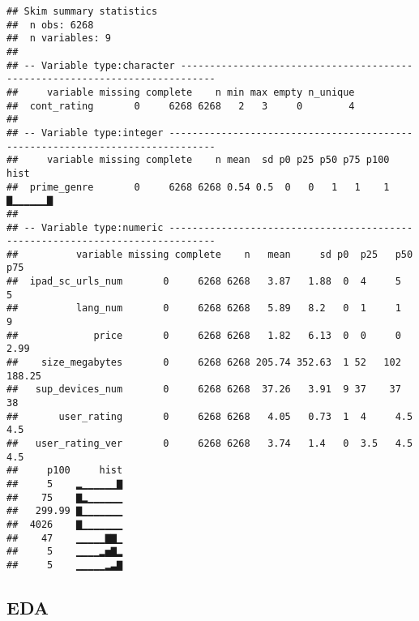 \documentclass[]{article}
\newenvironment{Shaded}{\begin{snugshade}}{\end{snugshade}}
\newcommand{\KeywordTok}[1]{\textcolor[rgb]{0.13,0.29,0.53}{\textbf{#1}}}
\newcommand{\DecValTok}[1]{\textcolor[rgb]{0.00,0.00,0.81}{#1}}
\newcommand{\StringTok}[1]{\textcolor[rgb]{0.31,0.60,0.02}{#1}}
\newcommand{\CommentTok}[1]{\textcolor[rgb]{0.56,0.35,0.01}{\textit{#1}}}
\newcommand{\OperatorTok}[1]{\textcolor[rgb]{0.81,0.36,0.00}{\textbf{#1}}}
\newcommand{\NormalTok}[1]{#1}
\begin{document}
\begin{verbatim}
## Skim summary statistics
##  n obs: 6268 
##  n variables: 9 
## 
## -- Variable type:character ----------------------------------------------------------------------------
##     variable missing complete    n min max empty n_unique
##  cont_rating       0     6268 6268   2   3     0        4
## 
## -- Variable type:integer ------------------------------------------------------------------------------
##     variable missing complete    n mean  sd p0 p25 p50 p75 p100     hist
##  prime_genre       0     6268 6268 0.54 0.5  0   0   1   1    1 ▇▁▁▁▁▁▁▇
## 
## -- Variable type:numeric ------------------------------------------------------------------------------
##          variable missing complete    n   mean     sd p0  p25   p50    p75
##  ipad_sc_urls_num       0     6268 6268   3.87   1.88  0  4     5     5   
##          lang_num       0     6268 6268   5.89   8.2   0  1     1     9   
##             price       0     6268 6268   1.82   6.13  0  0     0     2.99
##    size_megabytes       0     6268 6268 205.74 352.63  1 52   102   188.25
##   sup_devices_num       0     6268 6268  37.26   3.91  9 37    37    38   
##       user_rating       0     6268 6268   4.05   0.73  1  4     4.5   4.5 
##   user_rating_ver       0     6268 6268   3.74   1.4   0  3.5   4.5   4.5 
##     p100     hist
##     5    ▂▁▁▁▁▁▁▇
##    75    ▇▂▁▁▁▁▁▁
##   299.99 ▇▁▁▁▁▁▁▁
##  4026    ▇▁▁▁▁▁▁▁
##    47    ▁▁▁▁▁▇▇▁
##     5    ▁▁▁▁▂▅▇▂
##     5    ▁▁▁▁▁▂▃▇
\end{verbatim}

\begin{Shaded}
\end{Shaded}

\subsection{EDA}\label{eda}
\end{document}
